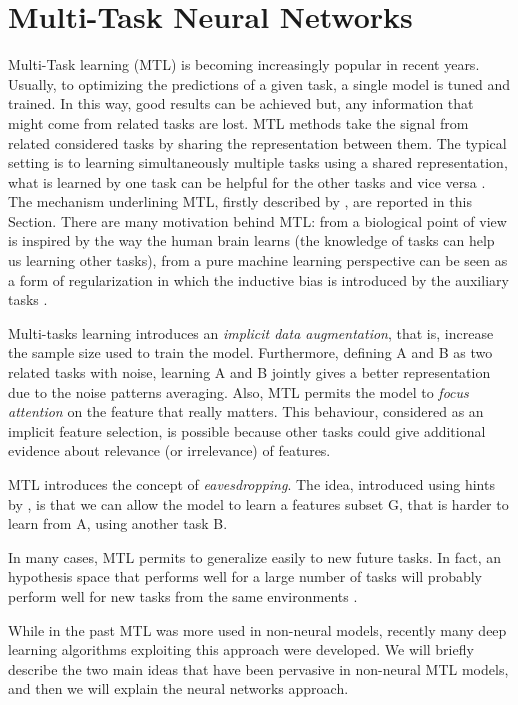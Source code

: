 \section{Multi-Task Neural Networks}\label{sec:MTLsection}
Multi-Task learning (MTL) is becoming increasingly popular in recent years.
Usually, to optimizing the predictions of a given task, a single model is
tuned and trained. In this way, good results can be achieved but, any
information that might come from related tasks are lost. MTL methods take
the signal from related considered tasks by sharing the
representation between them. The typical setting is to learning simultaneously multiple
tasks using a shared representation, what is learned by one
task can be helpful for the other tasks and vice versa \cite{Caruana97}. 
The mechanism underlining MTL, firstly described by \cite{Caruana97}, are reported in this Section.
There are many motivation behind MTL: from a biological point of view is
inspired by the way the human brain learns (the knowledge of tasks can help us
learning other tasks), from a pure machine learning perspective
can be seen as a form of regularization in which the inductive bias is
introduced by the auxiliary tasks \cite{Ruder2017}. 

Multi-tasks learning introduces an \emph{implicit data augmentation}, that is, increase the sample size used to train the model. Furthermore, defining A and B as two related tasks with noise, learning A and B jointly gives a better representation due to the noise patterns averaging.
Also, MTL permits the model to \emph{focus attention} on the feature that really matters. This behaviour, considered as an implicit feature selection, is possible because other tasks could give additional evidence about relevance (or irrelevance) of features. 

MTL introduces the concept of \emph{eavesdropping}. The idea, introduced using hints by \cite{AbuMostafa1990}, is that we can allow the model to learn a features subset G, that is harder to learn from A, using another task B. 

In many cases, MTL permits to generalize easily to new future tasks. In fact, an hypothesis space that performs well for a large number of tasks will probably perform well for new tasks from the same environments \cite{Ruder2017}. 

While in the past MTL
was more used in non-neural models, recently many deep learning algorithms exploiting this approach were developed. We will briefly describe the two main ideas that have been pervasive in non-neural MTL models, and then we will explain the neural networks approach.

